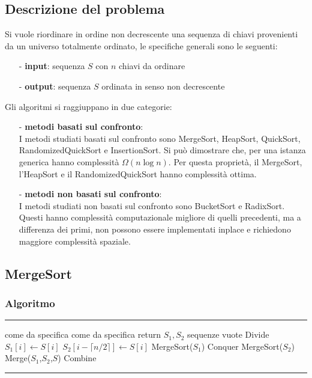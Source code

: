\documentclass[a4paper]{article}
\makeatletter
\newenvironment{algo}[4]{
	\noindent\rule{\textwidth}{0.4pt}
	\begin{algorithmic}[1]
		\addtocounter{ALG@line}{-1}
		\Procedure{#1}{#2}
		\Require #3
		\Ensure #4
		\Statex }{
		\EndProcedure
	\end{algorithmic}
	\rule{\textwidth}{0.4pt}}
\makeatother
\begin{document}
\subsection{Descrizione del problema}
Si vuole riordinare in ordine non decrescente una sequenza di chiavi provenienti da un universo totalmente ordinato, le specifiche
generali sono le seguenti:
\begin{itemize}[topsep=3pt, itemsep=0pt]
	\item[-] \textbf{input}: sequenza \(S\) con \(n\) chiavi da ordinare
	\item[-] \textbf{output}: sequenza \(S\) ordinata in senso non decrescente
\end{itemize}
Gli algoritmi si raggiuppano in due categorie:
\begin{itemize}[topsep=3pt, itemsep=0pt]
	\item[-] \textbf{metodi basati sul confronto}: \\
	I metodi studiati basati sul confronto sono MergeSort, HeapSort, QuickSort, RandomizedQuickSort e InsertionSort. Si può dimostrare
	che, per una istanza generica hanno complessità \(\Omega(n \log n)\). Per questa proprietà, il MergeSort, l'HeapSort e il RandomizedQuickSort
	hanno complessità ottima.
	\item[-] \textbf{metodi non basati sul confronto}: \\
	I metodi studiati non basati sul confronto sono BucketSort e RadixSort. Questi hanno complessità computazionale migliore di
	quelli precedenti, ma a differenza dei primi, non possono essere implementati inplace e richiedono maggiore complessità spaziale.
\end{itemize}

\subsection{MergeSort}
\subsubsection*{Algoritmo}
\begin{algo}{MergeSort}{$S$}{come da specifica}{come da specifica}
	 return
	\Else
		\State \(S_1, S_2\) sequenze vuote \Comment Divide
		 \(S_1[i] \gets S[i]\)
		\EndFor
		 \(S_2[i-\lceil n/2 \rceil] \gets S[i]\)
		\EndFor
		\State MergeSort(\(S_1\)) \Comment Conquer
		\State MergeSort(\(S_2\))
		\State Merge(\(S_1\),\(S_2\),\(S\)) \Comment Combine
	\EndIf
\end{algo}
\end{document}

